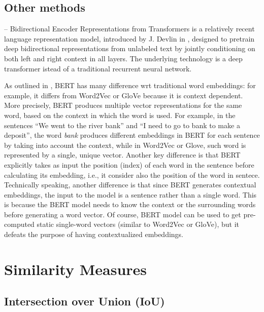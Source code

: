 \subsection{Other methods}

 -- Bidirectional Encoder Representations from
Transformers is a relatively recent language representation model,
introduced by J. Devlin \etal{} in \cite{devlin2018bert}, designed to
pretrain deep bidirectional representations from unlabeled text by
jointly conditioning on both left and right context in all layers. The
underlying technology is a deep transformer istead of a traditional
recurrent neural network.

As outlined in \cite{gupta2020differences}, BERT has many difference
wrt traditional word embeddings: for example, it differs from Word2Vec
or GloVe because it is context dependent. More precisely, BERT
produces multiple vector representations for the same word, based on
the context in which the word is used. For example, in the sentences
``We went to the river bank'' and ``I need to go to bank to make a
deposit'', the word \textit{bank} produces different embeddings in
BERT for each sentence by taking into account the context, while in
Word2Vec or Glove, such word is represented by a single, unique 
vector. Another key difference is that BERT explicitly takes as input
the position (index) of each word in the sentence before calculating
its embedding, i.e., it consider also the position of the word in
sentece. Technically speaking, another difference is that since BERT
generates contextual embeddings, the input to the model is a sentence
rather than a single word. This is because the BERT model needs to
know the context or the surrounding words before generating a word
vector. Of course, BERT model can be used to get pre-computed static
single-word vectors (similar to Word2Vec or GloVe), but it defeats the
purpose of having contextualized embeddings.

\section{Similarity Measures}

\subsection{Intersection over Union (IoU)}
\label{subsec:iou}

